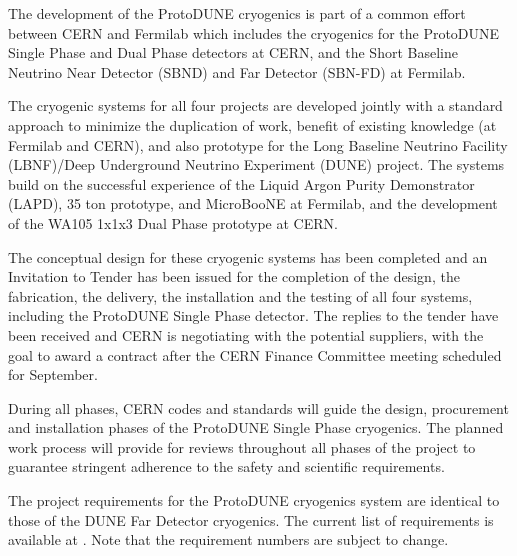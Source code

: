 The development of the ProtoDUNE cryogenics is part of a common effort between CERN and Fermilab which includes the cryogenics for the ProtoDUNE Single Phase and Dual Phase detectors at CERN, and the Short Baseline Neutrino Near Detector (SBND) and Far Detector (SBN-FD) at Fermilab.

The cryogenic systems for all four projects are developed jointly with a standard approach to minimize the duplication of work, benefit of existing knowledge (at Fermilab and CERN), and also prototype for the Long Baseline Neutrino Facility (LBNF)/Deep Underground Neutrino Experiment (DUNE) project. The systems build on the successful experience of the Liquid Argon Purity Demonstrator (LAPD), 35 ton prototype, and MicroBooNE at Fermilab, and the development of the WA105 1x1x3 Dual Phase prototype at CERN.

The conceptual design for these cryogenic systems has been completed and an Invitation to Tender has been issued for the completion of the design, the fabrication, the delivery, the installation and the testing of all four systems, including the ProtoDUNE Single Phase detector. The replies to the tender have been received and CERN is negotiating with the potential suppliers, with the goal to award a contract after the CERN Finance Committee meeting scheduled for September. 

During all phases, CERN codes and standards will guide the design, procurement and installation phases of the ProtoDUNE Single Phase cryogenics. The planned work process will provide for reviews throughout all phases of the project to guarantee stringent adherence to the safety and scientific requirements.




The project requirements for the ProtoDUNE cryogenics system are identical to those of the DUNE Far Detector cryogenics. The current list 
of requirements is available at \cite{DUNE_FD_cryogenics_req}. Note that the requirement numbers are subject to change.

